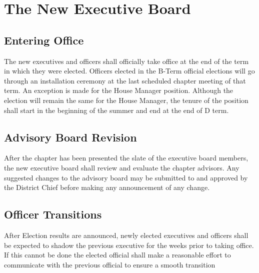 \chapter{The New Executive Board}
\label{cha:the-new-executive-board}

\section{Entering Office}
\label{sec:entering-office}

The new executives and officers shall officially take office at the end of the
term in which they were elected.
Officers elected in the B-Term official elections will go through an
installation ceremony at the last scheduled chapter meeting of that term.
An exception is made for the House Manager position.
Although the election will remain the same for the House Manager, the tenure of
the position shall start in the beginning of the summer and end at the end of D
term.

\section{Advisory Board Revision}
\label{sec:advisory-board-revision}

After the chapter has been presented the slate of the executive board members,
the new executive board shall review and evaluate the chapter advisors.
Any suggested changes to the advisory board may be submitted to and approved by
the District Chief before making any announcement of any change.

\section{Officer Transitions}
\label{sec:officer-transitions}

After Election results are announced, newly elected executives and officers
shall be expected to shadow the previous executive for the weeks prior to taking
office.
If this cannot be done the elected official shall make a reasonable effort to
communicate with the previous official to ensure a smooth transition

